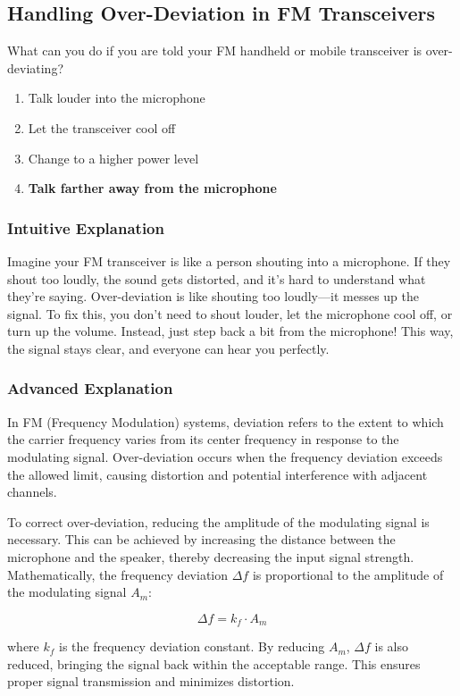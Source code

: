 \subsection{Handling Over-Deviation in FM Transceivers}
\label{T7B01}

\begin{tcolorbox}[colback=gray!10!white,colframe=black!75!black,title=T7B01]
What can you do if you are told your FM handheld or mobile transceiver is over-deviating?
\begin{enumerate}[label=\Alph*)]
    \item Talk louder into the microphone
    \item Let the transceiver cool off
    \item Change to a higher power level
    \item \textbf{Talk farther away from the microphone}
\end{enumerate}
\end{tcolorbox}

\subsubsection{Intuitive Explanation}
Imagine your FM transceiver is like a person shouting into a microphone. If they shout too loudly, the sound gets distorted, and it’s hard to understand what they’re saying. Over-deviation is like shouting too loudly—it messes up the signal. To fix this, you don’t need to shout louder, let the microphone cool off, or turn up the volume. Instead, just step back a bit from the microphone! This way, the signal stays clear, and everyone can hear you perfectly.

\subsubsection{Advanced Explanation}
In FM (Frequency Modulation) systems, deviation refers to the extent to which the carrier frequency varies from its center frequency in response to the modulating signal. Over-deviation occurs when the frequency deviation exceeds the allowed limit, causing distortion and potential interference with adjacent channels. 

To correct over-deviation, reducing the amplitude of the modulating signal is necessary. This can be achieved by increasing the distance between the microphone and the speaker, thereby decreasing the input signal strength. Mathematically, the frequency deviation $\Delta f$ is proportional to the amplitude of the modulating signal $A_m$:

\[
\Delta f = k_f \cdot A_m
\]

where $k_f$ is the frequency deviation constant. By reducing $A_m$, $\Delta f$ is also reduced, bringing the signal back within the acceptable range. This ensures proper signal transmission and minimizes distortion.

